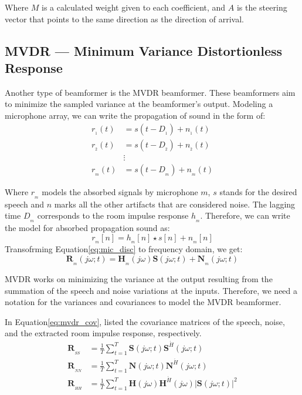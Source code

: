 Where \(M\) is a calculated weight given to each coefficient, and
\(A\) is the steering vector that points 
to the same direction as the direction of arrival.

\subsection{MVDR --- Minimum Variance Distortionless Response}
Another type of beamformer is the MVDR beamformer.
These beamformers aim to minimize the 
sampled variance at the beamformer's output. 
Modeling a microphone array, we can write the propagation of sound 
in the form of:
\begin{align}
    r_{_{1}}(t) &= s(t-D_{_{1}}) + n_{_{1}}(t) \nonumber \\
    r_{_{2}}(t) &= s(t-D_{_{2}}) + n_{_{2}}(t) \nonumber \\
    & \vdots  \nonumber \\
    r_{_{m}}(t) &= s(t-D_{_{m}}) + n_{_{m}}(t)
\end{align}

Where \(r_{_{m}}\) models the absorbed signals by microphone
\(m\), \(s\) stands for the desired speech and \(n\) 
marks all the other artifacts that are considered noise. 
The lagging time \(D_{_{m}}\) corresponds to the room impulse
response \(h_{_{m}}\). Therefore, we can write 
the model for absorbed propagation sound as:
\begin{equation}\label{eq:mic_disc}
    r_{_{m}}[n] = h_{_{m}}[n]\star s[n] + n_{_{m}}[n]
\end{equation}
Transofrming Equation\;\ref{eq:mic_disc} to frequency domain,
we get:
\begin{equation}\label{eq:mic_disc}
    \mathbf{R}_{_{m}}(j\omega;t) = \mathbf{H}_{_{m}}(j\omega)\mathbf{S}(j\omega;t) + \mathbf{N}_{_{m}}(j\omega;t)
\end{equation}

MVDR works on minimizing the variance at the 
output resulting from the summation of the 
speech and noise variations at the inputs. 
Therefore, we need a notation for the variances 
and covariances to model the MVDR beamformer. 

In Equation\;\ref{eq:mvdr_cov}, listed the covariance matrices of the
speech, noise, and the extracted room impulse response, respectively.
\begin{align}\label{eq:mvdr_cov}
    \mathbf{R}_{_{SS}} &= \frac{1}{T}\sum_{t=1}^{T}\mathbf{S}(j\omega;t)\mathbf{S}^{\acute{H}}(j\omega;t) \nonumber \\
    \mathbf{R}_{_{NN}} &= \frac{1}{T}\sum_{t=1}^{T}\mathbf{N}(j\omega;t)\mathbf{N}^{\acute{H}}(j\omega;t)\nonumber \\
    \mathbf{R}_{_{HH}} &= \frac{1}{T}\sum_{t=1}^{T}\mathbf{H}(j\omega)\mathbf{H}^{\acute{H}}(j\omega)|\mathbf{S}(j\omega;t)|^{2} 
\end{align}

